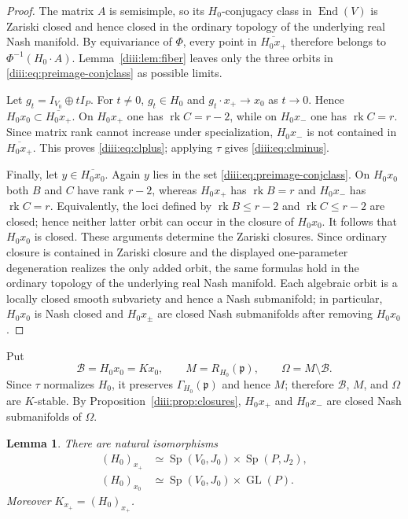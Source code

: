 \documentclass[11pt,reqno]{amsart}
\numberwithin{equation}{section}
\newtheorem{lemma}[theorem]{Lemma}
\theoremstyle{definition}
\theoremstyle{remark}
\newcommand{\GL}{\operatorname{GL}}
\newcommand{\Sp}{\operatorname{Sp}}
\newcommand{\End}{\operatorname{End}}
\newcommand{\rk}{\operatorname{rk}}
\newcommand{\fp}{\mathfrak p}
\begin{document}
\begin{proof}
The matrix $A$ is semisimple, so its $H_0$-conjugacy class in $\End(V)$ is Zariski closed and hence closed in the ordinary topology of the underlying real Nash manifold.  By equivariance of $\Phi$, every point in
$\overline{H_0x_+}$ therefore belongs to $\Phi^{-1}(H_0\cdot A)$.
Lemma~\ref{diii:lem:fiber} leaves only the three orbits in
\eqref{diii:eq:preimage-conjclass} as possible limits.

Let $g_t=I_{V_0}\oplus tI_P$.  For $t\ne0$, $g_t\in H_0$ and
$g_t\cdot x_+\to x_0$ as $t\to0$.  Hence
$H_0x_0\subset\overline{H_0x_+}$.  On $H_0x_+$ one has
$\rk C=r-2$, while on $H_0x_-$ one has $\rk C=r$.  Since matrix rank cannot increase under specialization, $H_0x_-$ is not contained in
$\overline{H_0x_+}$.  This proves \eqref{diii:eq:clplus}; applying $\tau$ gives \eqref{diii:eq:clminus}.

Finally, let $y\in\overline{H_0x_0}$.  Again $y$ lies in the set
\eqref{diii:eq:preimage-conjclass}.  On $H_0x_0$ both $B$ and $C$ have rank
$r-2$, whereas $H_0x_+$ has $\rk B=r$ and $H_0x_-$ has $\rk C=r$.
Equivalently, the loci defined by $\rk B\le r-2$ and $\rk C\le r-2$ are closed; hence neither latter orbit can occur in the closure of $H_0x_0$.  It follows that $H_0x_0$ is closed.  These arguments determine the Zariski closures.  Since ordinary closure is
contained in Zariski closure and the displayed one-parameter degeneration
realizes the only added orbit, the same formulas hold in the ordinary topology
of the underlying real Nash manifold.  Each algebraic orbit is a locally closed
smooth subvariety and hence a Nash submanifold; in particular, $H_0x_0$ is Nash
closed and $H_0x_\pm$ are closed Nash submanifolds after removing $H_0x_0$.
\end{proof}

Put
\[
  \mathcal B=H_0x_0=Kx_0,
  \qquad
  M=R_{H_0}(\fp),
  \qquad
  \Omega=M\setminus\mathcal B.
\]
Since $\tau$ normalizes $H_0$, it preserves $\Gamma_{H_0}(\fp)$ and hence $M$; therefore $\mathcal B$, $M$, and $\Omega$ are $K$-stable.  By Proposition~\ref{diii:prop:closures}, $H_0x_+$ and $H_0x_-$ are closed Nash submanifolds of $\Omega$.

\begin{lemma}\label{diii:lem:stabilizers}
There are natural isomorphisms
\begin{align}
 (H_0)_{x_+}&\simeq \Sp(V_0,J_0)\times\Sp(P,J_2),\label{diii:eq:stabplus}\\
 (H_0)_{x_0}&\simeq \Sp(V_0,J_0)\times\GL(P).\label{diii:eq:stabzero}
\end{align}
Moreover $K_{x_+}=(H_0)_{x_+}$.
\end{lemma}
\end{document}
